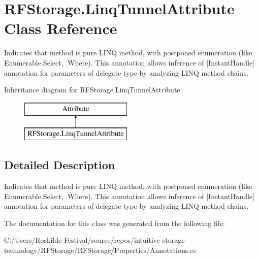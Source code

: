 \hypertarget{class_r_f_storage_1_1_linq_tunnel_attribute}{}\section{R\+F\+Storage.\+Linq\+Tunnel\+Attribute Class Reference}
\label{class_r_f_storage_1_1_linq_tunnel_attribute}


Indicates that method is pure L\+I\+NQ method, with postponed enumeration (like Enumerable.\+Select, .Where). This annotation allows inference of \mbox{[}Instant\+Handle\mbox{]} annotation for parameters of delegate type by analyzing L\+I\+NQ method chains.  


Inheritance diagram for R\+F\+Storage.\+Linq\+Tunnel\+Attribute\+:\begin{figure}[H]
\begin{center}
\leavevmode
\includegraphics[height=2.000000cm]{class_r_f_storage_1_1_linq_tunnel_attribute}
\end{center}
\end{figure}


\subsection{Detailed Description}
Indicates that method is pure L\+I\+NQ method, with postponed enumeration (like Enumerable.\+Select, .Where). This annotation allows inference of \mbox{[}Instant\+Handle\mbox{]} annotation for parameters of delegate type by analyzing L\+I\+NQ method chains. 



The documentation for this class was generated from the following file\+:\begin{DoxyCompactItemize}
\item 
C\+:/\+Users/\+Roskilde Festival/source/repos/intuitive-\/storage-\/technology/\+R\+F\+Storage/\+R\+F\+Storage/\+Properties/Annotations.\+cs\end{DoxyCompactItemize}
